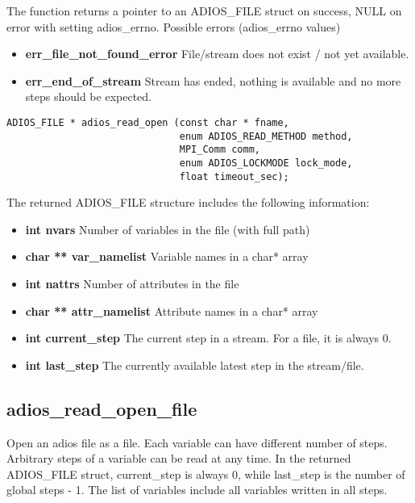 \noindent The function returns a pointer to an ADIOS\_FILE struct on success, NULL on error with setting adios\_errno. 
Possible errors (adios\_errno values)

\begin{itemize}
\item{\bf err\_file\_not\_found\_error}  File/stream does not exist / not yet available.
\item{\bf err\_end\_of\_stream}  Stream has ended, nothing is available and no more steps should be expected.
\end{itemize}


\begin{lstlisting}[alsolanguage=C]
ADIOS_FILE * adios_read_open (const char * fname, 
                              enum ADIOS_READ_METHOD method, 
                              MPI_Comm comm, 
                              enum ADIOS_LOCKMODE lock_mode,
                              float timeout_sec);
\end{lstlisting}

\noindent The returned ADIOS\_FILE structure includes the following information:

\begin{itemize}
\item{\bf int nvars}   Number of variables in the file (with full path)
\item{\bf char ** var\_namelist}   Variable names in a char* array
\item{\bf int nattrs}  Number of attributes in the file
\item{\bf char ** attr\_namelist}  Attribute names in a char* array
\item{\bf int current\_step}  The current step in a stream. For a file, it is always 0. 
\item{\bf int last\_step}     The currently available latest step in the stream/file.  
\end{itemize}


\subsection{adios\_read\_open\_file}

Open an adios file as a file. Each variable can have different number of steps. Arbitrary steps of a variable
can be read at any time.  In the returned ADIOS\_FILE struct, current\_step is always 0, while last\_step is the number of global steps - 1. The list of variables include all variables written in all steps. 

